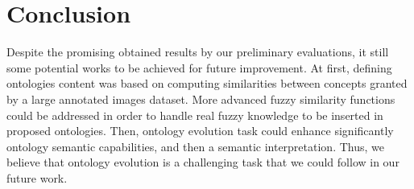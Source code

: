 \section{Conclusion}

Despite the promising obtained results by our preliminary evaluations, it still some
potential works to be achieved for future improvement. At first, defining ontologies
content was based on computing similarities between concepts granted by a large
annotated images dataset. More advanced fuzzy similarity functions could be addressed in order to handle real fuzzy knowledge to be inserted in proposed ontologies. Then, ontology evolution task could enhance significantly ontology semantic capabilities, and then a semantic interpretation. Thus, we believe that
ontology evolution is a challenging task that we could follow in our future work.
	
